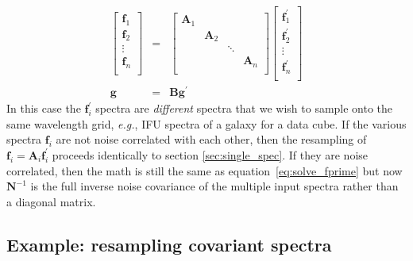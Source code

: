 \documentclass[12pt]{article}
\newcommand{\A}{\mathbf{A}}
\newcommand{\N}{\mathbf{N}}
\newcommand{\f}{\mathbf{f}}
\begin{document}
\begin{eqnarray}
    \left[ \begin{array}{c}
        \f_1 \\
        \f_2 \\
        \vdots \\
        \f_n \\
    \end{array}
    \right] & = & \left[ \begin{array}{cccc}
        \A_1 \\
        & \A_2 \\
        & & \ddots \\
        & & & \A_n \\
    \end{array}
    \right] \left[ \begin{array}{c}
        \f_1^\prime \\
        \f_2^\prime \\
        \vdots \\
        \f_n^\prime \\
    \end{array}    
    \right] \\
    \mathbf{g} & = & \mathbf{B} \mathbf{g}^\prime
\end{eqnarray}
In this case the $\f_i^\prime$ spectra are {\em different} spectra that
we wish to sample onto the same wavelength grid, {\it e.g.}, IFU spectra
of a galaxy for a data cube.  If the various spectra $\f_i$ are not noise
correlated with each other,
then the resampling of $\f_i = \A_i \f_i^\prime$ proceeds identically to
section \ref{sec:single_spec}.  If they are noise correlated, then the
math is still the same as equation~\ref{eq:solve_fprime}
but now $\N^{-1}$ is the full inverse noise covariance
of the multiple input spectra rather than a diagonal matrix.

\subsection{Example: resampling covariant spectra}
\end{document}
